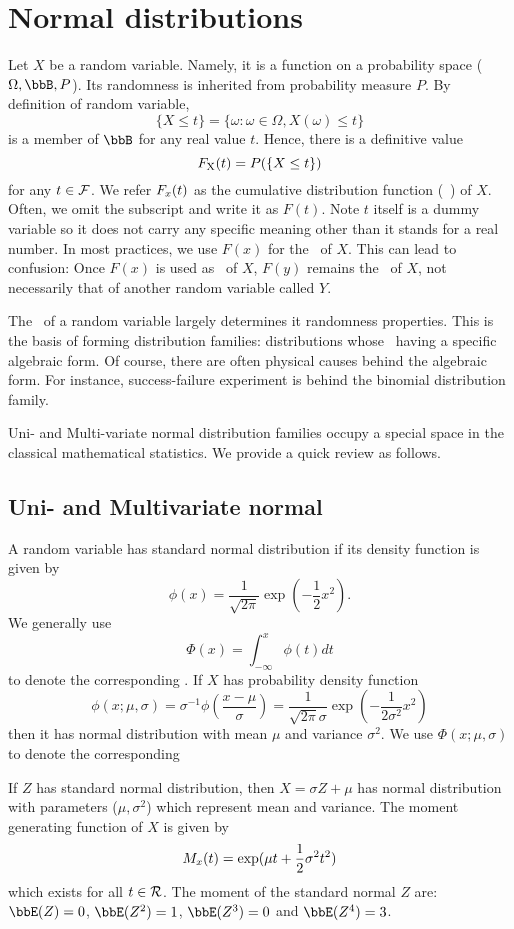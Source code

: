 \chapter{Normal distributions}

Let $X$ be a random variable. Namely, it is a function on a probability
space ($\Omega, \bbB, P$). Its randomness is inherited from probability
measure $P$. By definition of random variable, 
\[
\{ X \leq t\} = \{ \omega: \omega \in \Omega, X(\omega) \leq t\}
\]
is a member of $\bbB$ for any real value $t$.
Hence, there is a definitive value
\[
F_{\mbox{\sc x}}(t) = P( \{ X \leq t\})
\]
for any $t \in {\cal F}$. We refer $F_{\sc x}(t)$ as the cumulative
distribution function (\cdf\ ) of $X$. Often, we omit the subscript and write
it as $F(t)$. Note $t$ itself is a dummy variable so it does not carry
any specific meaning other than it stands for a real number.
In most practices, we use $F(x)$ for the \cdf\ of $X$.
This can lead to confusion: Once $F(x)$ is used as \cdf\ of $X$,
$F(y)$ remains the \cdf\ of $X$, not necessarily that of 
another random variable called $Y$.

The \cdf\ of a random variable largely determines it randomness properties.
This is the basis of forming distribution families: distributions whose \cdf\
having a specific algebraic form. 
Of course, there are often physical causes behind the algebraic form.
For instance, success-failure experiment is behind the binomial distribution family.


Uni- and Multi-variate normal distribution families occupy a special
space in the classical mathematical statistics. We provide a quick review
as follows.


\section{Uni- and Multivariate normal}

A random variable has standard normal
distribution if its density function is given by
\[
\phi(x) = \frac{1}{\sqrt{2\pi}} \exp( - \frac{1}{2} x^2 ).
\]
We generally use
\[
\Phi(x) = \int_{-\infty}^x \phi(t) dt
\]
to denote the corresponding \cdf. 
If $X$ has probability density function
\[
\phi(x; \mu, \sigma)
 = \sigma^{-1}  \phi( \frac{x - \mu}{\sigma})
=
\frac{1}{\sqrt{2\pi}\sigma } \exp( - \frac{1}{2\sigma^2} x^2 )
\]
then it has normal distribution with mean $\mu$ and variance
$\sigma^2$.
We use $\Phi(x; \mu, \sigma)$ to denote the corresponding \cdf

If $Z$ has standard normal distribution, then $X = \sigma Z + \mu$ has
normal distribution with parameters ($\mu, \sigma^2$) which
represent mean and variance.
The moment generating function of $X$ is given by
\[
M_{\sc x} (t) = \exp( \mu t + \frac{1}{2} \sigma^2 t^2 )
\]
which exists for all $t \in {\cal R}$.
The moment of the standard normal $Z$ are:
$\bbE(Z) = 0$, $\bbE(Z^2) =1$, $\bbE(Z^3) = 0$ and $\bbE(Z^4) = 3$.


